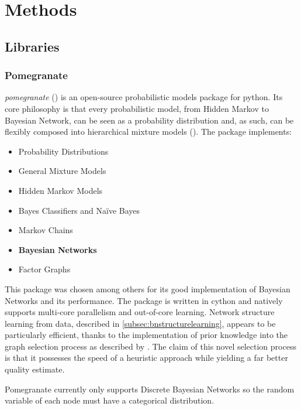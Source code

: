 
\section{Methods} 

\subsection{Libraries}\label{subsec:libraries}
\subsubsection{Pomegranate}
\textit{pomegranate} (\cite{pomegranate}) is an open-source probabilistic models package for python.
Its core philosophy is that every probabilistic model, from Hidden Markov to Bayesian Network, can be seen as a probability distribution and, as such, can be flexibly composed into hierarchical mixture models (\cite{Schreiber2017}).
The package implements:
\begin{itemize}
	\item Probability Distributions
	\item General Mixture Models
	\item Hidden Markov Models
	\item Bayes Classifiers and Na{\"i}ve Bayes
	\item Markov Chains
	\item \textbf{Bayesian Networks}
	\item Factor Graphs
\end{itemize} 

This package was chosen among others for its good implementation of Bayesian Networks and its performance.
The package is written in cython and natively supports multi-core parallelism and out-of-core learning.
Network structure learning from data, described in \ref{subsec:bnstructurelearning}, appears to be particularly efficient, thanks to the implementation of prior knowledge into the graph selection process as described by \cite{schreiber_noble_2017}.
The claim of this novel selection process is that it possesses the speed of a heuristic approach while yielding a far better quality estimate.

Pomegranate currently only supports Discrete Bayesian Networks so the random variable of each node must have a categorical distribution.

